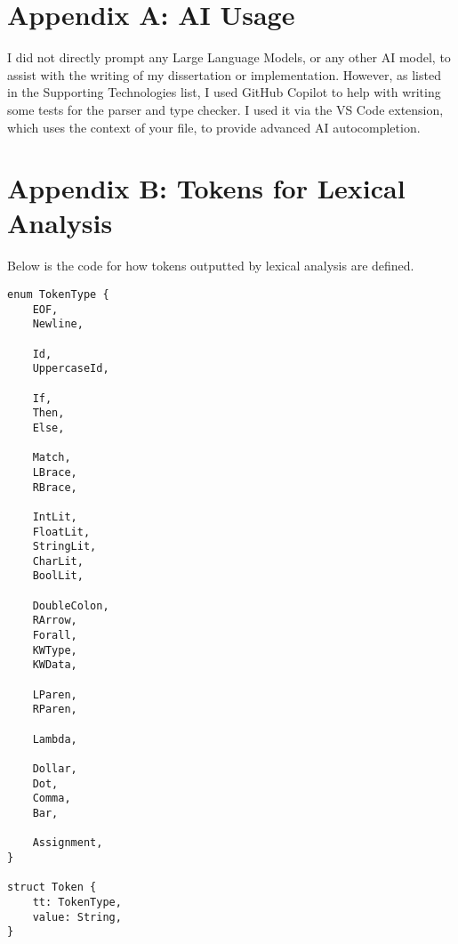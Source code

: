 \documentclass[
author=Kiran Sturt,
degree=BSc,
title=Implementing a Step by Step Evaluator for a Simple Functional Programming language,
unit=COMS30045,twoside]{dissertation}
\theoremstyle{definition}
\theoremstyle{break}
\theoremstyle{definition}
\begin{document}
\appendix

\chapter{Appendix A: AI Usage}
\label{appx:ai_prompt}

I did not directly prompt any Large Language Models, or any other AI model, to assist with the writing of my dissertation or implementation. However, as listed in the Supporting Technologies list, I used GitHub Copilot to help with writing some tests for the parser and type checker. I used it via the VS Code extension, which uses the context of your file, to provide advanced AI autocompletion.


\chapter{Appendix B: Tokens for Lexical Analysis}
\label{appx:tokens}
Below is the code for how tokens outputted by lexical analysis are defined. 
\begin{lstlisting}
enum TokenType {
    EOF,
    Newline,

    Id,
    UppercaseId,

    If,
    Then,
    Else,

    Match,
    LBrace,
    RBrace,

    IntLit,
    FloatLit,
    StringLit,
    CharLit,
    BoolLit,

    DoubleColon,
    RArrow,
    Forall,
    KWType,
    KWData,

    LParen,
    RParen,

    Lambda,

    Dollar,
    Dot,
    Comma,
    Bar,

    Assignment,
}

struct Token {
    tt: TokenType,
    value: String,
}
\end{lstlisting}
\end{document}
